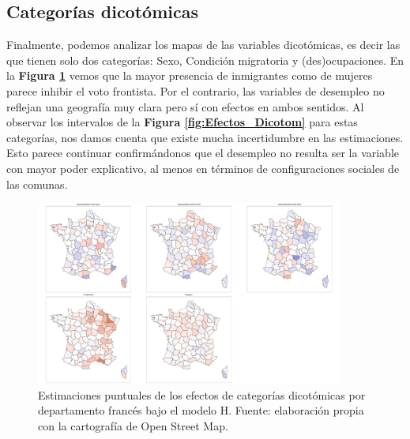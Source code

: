 \subsection{Categorías dicotómicas}

Finalmente, podemos analizar los mapas de las variables dicotómicas, es decir las que tienen solo dos categorías: Sexo, Condición migratoria y (des)ocupaciones. En la \textbf{Figura \ref{fig:Mapa_Efectos_Dicotom}} vemos que la mayor presencia de inmigrantes como de mujeres parece inhibir el voto frontista. Por el contrario, las variables de desempleo no reflejan una geografía muy clara pero sí con efectos en ambos sentidos. Al observar los intervalos de la \textbf{Figura \ref{fig:Efectos_Dicotom}} para estas categorías, nos damos cuenta que existe mucha incertidumbre en las estimaciones. Esto parece continuar confirmándonos que el desempleo no resulta ser la variable con mayor poder explicativo, al menos en términos de configuraciones sociales de las comunas.\\ 

\begin{figure}[h]
	\centering
	\includegraphics[width = 0.9\textwidth]{Figs/Efectos/Mapa_Efectos_Dicotom_Modelo_H}
	\caption{Estimaciones puntuales de los efectos de categorías dicotómicas por departamento francés bajo el modelo H. Fuente: elaboración propia con la cartografía de Open Street Map.}
	\label{fig:Mapa_Efectos_Dicotom}
\end{figure}

